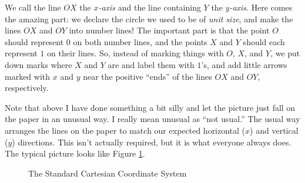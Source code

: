 \documentclass[00-livre-main.tex]{subfiles}
\begin{document}
\begin{figure}[h!]
\centering
{}
\end{figure}

We call the line $OX$ the \emph{$x$-axis} and the line containing $Y$ the \emph{$y$-axis}. Here comes the amazing part: we declare the circle we used to be of \emph{unit size}, and make the lines $OX$ and $OY$ into number lines! The important part is that the point $O$ should represent $0$ on both number lines, and the points $X$ and $Y$ should each represent $1$ on their lines. So, instead of marking things with $O$, $X$, and $Y$, we put down marks where $X$ and $Y$ are and label them with $1$'s, and add little arrows marked with $x$ and $y$ near the positive ``ends'' of the lines $OX$ and $OY$, respectively.

\begin{figure}[h!]
\centering
{}
\end{figure}

Note that above I have done something a bit silly and let the picture just fall on the paper in an unusual way.
I really mean unusual as ``not usual.''
The usual way arranges the lines on the paper to match our expected horizontal ($x$) and vertical ($y$) directions.
This isn't actually required, but it is what everyone always does.
The typical picture looks like Figure \ref{fig:cartesian-coords}.


\begin{figure}[h]
\centering
{}
\caption{The Standard Cartesian Coordinate System}
\label{fig:cartesian-coords}
\end{figure}
\end{document}
